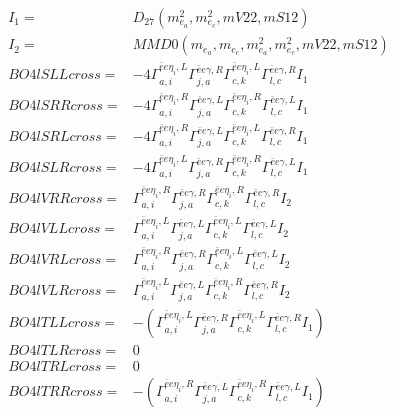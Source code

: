 \documentclass[A4,landscape]{article}
\begin{document}
\begin{align} 
I_1 = & D_{27}(m^2_{e_{{a}}}, m^2_{e_{{c}}}, mV22, mS12) \\ 
I_2 = & MMD0(m_{e_{{a}}}, m_{e_{{c}}}, m^2_{e_{{a}}}, m^2_{e_{{c}}}, mV22, mS12) \\ 
  BO4lSLLcross= & -4  \Gamma^{\bar{e}e \eta_i ,L}_{a, i} \Gamma^{\bar{e}e \gamma ,R}_{j, a} \Gamma^{\bar{e}e \eta_i ,L}_{c, k} \Gamma^{\bar{e}e \gamma ,R}_{l, c} I_1 \\ 
  BO4lSRRcross= & -4  \Gamma^{\bar{e}e \eta_i ,R}_{a, i} \Gamma^{\bar{e}e \gamma ,L}_{j, a} \Gamma^{\bar{e}e \eta_i ,R}_{c, k} \Gamma^{\bar{e}e \gamma ,L}_{l, c} I_1 \\ 
  BO4lSRLcross= & -4  \Gamma^{\bar{e}e \eta_i ,R}_{a, i} \Gamma^{\bar{e}e \gamma ,L}_{j, a} \Gamma^{\bar{e}e \eta_i ,L}_{c, k} \Gamma^{\bar{e}e \gamma ,R}_{l, c} I_1 \\ 
  BO4lSLRcross= & -4  \Gamma^{\bar{e}e \eta_i ,L}_{a, i} \Gamma^{\bar{e}e \gamma ,R}_{j, a} \Gamma^{\bar{e}e \eta_i ,R}_{c, k} \Gamma^{\bar{e}e \gamma ,L}_{l, c} I_1 \\ 
  BO4lVRRcross= &  \Gamma^{\bar{e}e \eta_i ,R}_{a, i} \Gamma^{\bar{e}e \gamma ,R}_{j, a} \Gamma^{\bar{e}e \eta_i ,R}_{c, k} \Gamma^{\bar{e}e \gamma ,R}_{l, c} I_2 \\ 
  BO4lVLLcross= &  \Gamma^{\bar{e}e \eta_i ,L}_{a, i} \Gamma^{\bar{e}e \gamma ,L}_{j, a} \Gamma^{\bar{e}e \eta_i ,L}_{c, k} \Gamma^{\bar{e}e \gamma ,L}_{l, c} I_2 \\ 
  BO4lVRLcross= &  \Gamma^{\bar{e}e \eta_i ,R}_{a, i} \Gamma^{\bar{e}e \gamma ,R}_{j, a} \Gamma^{\bar{e}e \eta_i ,L}_{c, k} \Gamma^{\bar{e}e \gamma ,L}_{l, c} I_2 \\ 
  BO4lVLRcross= &  \Gamma^{\bar{e}e \eta_i ,L}_{a, i} \Gamma^{\bar{e}e \gamma ,L}_{j, a} \Gamma^{\bar{e}e \eta_i ,R}_{c, k} \Gamma^{\bar{e}e \gamma ,R}_{l, c} I_2 \\ 
  BO4lTLLcross= & -( \Gamma^{\bar{e}e \eta_i ,L}_{a, i} \Gamma^{\bar{e}e \gamma ,R}_{j, a} \Gamma^{\bar{e}e \eta_i ,L}_{c, k} \Gamma^{\bar{e}e \gamma ,R}_{l, c} I_1) \\ 
  BO4lTLRcross= & 0 \\ 
  BO4lTRLcross= & 0 \\ 
  BO4lTRRcross= & -( \Gamma^{\bar{e}e \eta_i ,R}_{a, i} \Gamma^{\bar{e}e \gamma ,L}_{j, a} \Gamma^{\bar{e}e \eta_i ,R}_{c, k} \Gamma^{\bar{e}e \gamma ,L}_{l, c} I_1) \\ 
\end{align} 
\end{document}
